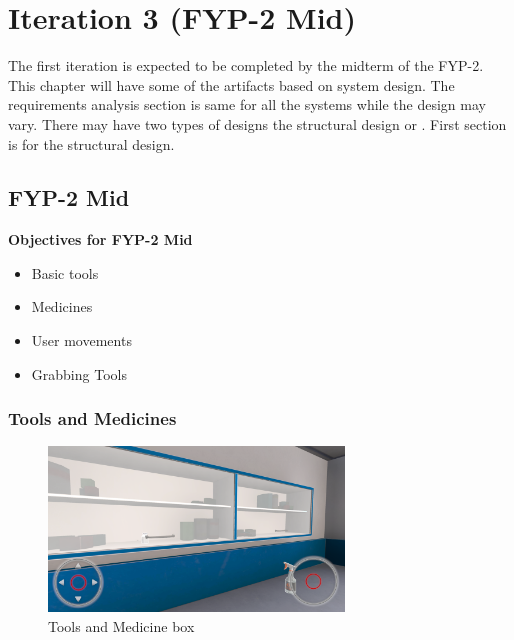 \chapter{Iteration 3 (FYP-2 Mid)}
\label{ch:iter3}
The first iteration is expected to be completed by the midterm of the FYP-2.
This chapter will have some of the artifacts based on system design. The requirements analysis section is same for all the systems while the design may vary. There may have two types of designs the structural design or . First section is for the structural design.
\section{FYP-2 Mid}
\textbf{Objectives for FYP-2 Mid}
	\begin{itemize}
		\item Basic tools
		\item Medicines 
		\item User movements
		\item Grabbing Tools
	\end{itemize}
\newpage
\subsection{Tools and Medicines}
\begin{figure}[h]
	\centering
	\includegraphics[width=0.7\textwidth, height=0.3\textheight]{Images/Tools and Medicine.png}
	\caption{Tools and Medicine box}
	\label{fig:Tools and Medicine}
\end{figure}

